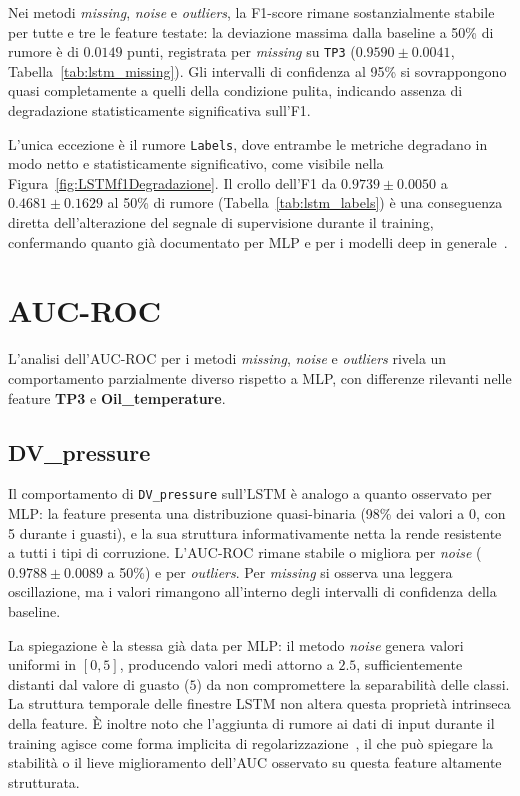 \documentclass[../main.tex]{subfiles}
\begin{document}
Nei metodi \textit{missing}, \textit{noise} e \textit{outliers}, la F1-score rimane sostanzialmente stabile per tutte e tre le feature testate: la deviazione massima dalla baseline a 50\% di rumore è di $0.0149$ punti, registrata per \textit{missing} su \texttt{TP3} ($0.9590 \pm 0.0041$, Tabella~\ref{tab:lstm_missing}). Gli intervalli di confidenza al 95\% si sovrappongono quasi completamente a quelli della condizione pulita, indicando assenza di degradazione statisticamente significativa sull'F1.

L'unica eccezione è il rumore \texttt{Labels}, dove entrambe le metriche degradano in modo netto e statisticamente significativo, come visibile nella Figura~\ref{fig:LSTMf1Degradazione}. Il crollo dell'F1 da $0.9739 \pm 0.0050$ a $0.4681 \pm 0.1629$ al 50\% di rumore (Tabella~\ref{tab:lstm_labels}) è una conseguenza diretta dell'alterazione del segnale di supervisione durante il training, confermando quanto già documentato per MLP e per i modelli deep in generale~\cite{zhang2017understandingdeeplearningrequires}.

\section{AUC-ROC}

L'analisi dell'AUC-ROC per i metodi \textit{missing}, \textit{noise} e \textit{outliers} rivela un comportamento parzialmente diverso rispetto a MLP, con differenze rilevanti nelle feature \textbf{TP3} e \textbf{Oil\_temperature}.

\subsection{DV\_pressure}
Il comportamento di \texttt{DV\_pressure} sull'LSTM è analogo a quanto osservato per MLP: la feature presenta una distribuzione quasi-binaria (98\% dei valori a 0, con 5 durante i guasti), e la sua struttura informativamente netta la rende resistente a tutti i tipi di corruzione. L'AUC-ROC rimane stabile o migliora per \textit{noise} ($0.9788 \pm 0.0089$ a 50\%) e per \textit{outliers}. Per \textit{missing} si osserva una leggera oscillazione, ma i valori rimangono all'interno degli intervalli di confidenza della baseline.

La spiegazione è la stessa già data per MLP: il metodo \textit{noise} genera valori uniformi in $[0, 5]$, producendo valori medi attorno a $2.5$, sufficientemente distanti dal valore di guasto ($5$) da non compromettere la separabilità delle classi. La struttura temporale delle finestre LSTM non altera questa proprietà intrinseca della feature. È inoltre noto che l'aggiunta di rumore ai dati di input durante il training agisce come forma implicita di regolarizzazione~\cite{bishop1995training}, il che può spiegare la stabilità o il lieve miglioramento dell'AUC osservato su questa feature altamente strutturata.
\end{document}

